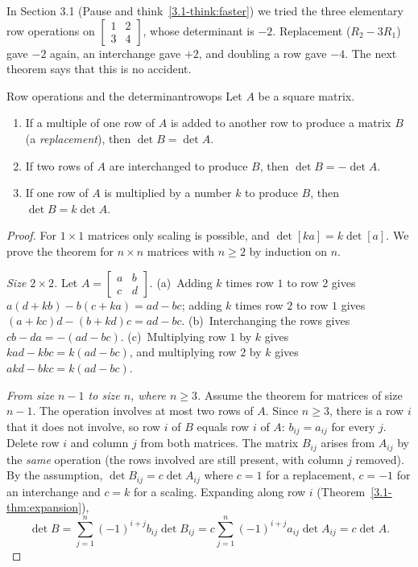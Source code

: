 \documentclass[11pt]{article}
\begin{document}
In Section 3.1 (Pause and think~\ref{3.1-think:faster}) we tried the three elementary row operations on $\begin{bmatrix}1&2\\3&4\end{bmatrix}$, whose determinant is $-2$. Replacement ($R_2-3R_1$) gave $-2$ again, an interchange gave $+2$, and doubling a row gave $-4$. The next theorem says that this is no accident.

\begin{thm}{Row operations and the determinant}{rowops}
Let $A$ be a square matrix.
\begin{enumerate}
  \item[(a)] If a multiple of one row of $A$ is added to another row to produce a matrix $B$ (a \emph{replacement}), then $\det B=\det A$.
  \item[(b)] If two rows of $A$ are interchanged to produce $B$, then $\det B=-\det A$.
  \item[(c)] If one row of $A$ is multiplied by a number $k$ to produce $B$, then $\det B=k\det A$.
\end{enumerate}
\end{thm}

\begin{proof}
For $1\times1$ matrices only scaling is possible, and $\det[ka]=k\det[a]$. We prove the theorem for $n\times n$ matrices with $n\geq2$ by induction on $n$.

\emph{Size $2\times2$.} Let $A=\begin{bmatrix}a&b\\c&d\end{bmatrix}$. (a)~Adding $k$ times row $1$ to row $2$ gives $a(d+kb)-b(c+ka)=ad-bc$; adding $k$ times row $2$ to row $1$ gives $(a+kc)d-(b+kd)c=ad-bc$. (b)~Interchanging the rows gives $cb-da=-(ad-bc)$. (c)~Multiplying row $1$ by $k$ gives $kad-kbc=k(ad-bc)$, and multiplying row $2$ by $k$ gives $akd-bkc=k(ad-bc)$.

\emph{From size $n-1$ to size $n$, where $n\geq3$.} Assume the theorem for matrices of size $n-1$. The operation involves at most two rows of $A$. Since $n\geq3$, there is a row $i$ that it does not involve, so row $i$ of $B$ equals row $i$ of $A$: $b_{ij}=a_{ij}$ for every $j$. Delete row $i$ and column $j$ from both matrices. The matrix $B_{ij}$ arises from $A_{ij}$ by the \emph{same} operation (the rows involved are still present, with column $j$ removed). By the assumption, $\det B_{ij}=c\det A_{ij}$ where $c=1$ for a replacement, $c=-1$ for an interchange and $c=k$ for a scaling. Expanding along row $i$ (Theorem~\ref{3.1-thm:expansion}),
\[
\det B=\sum_{j=1}^{n}(-1)^{i+j}b_{ij}\det B_{ij}=c\sum_{j=1}^{n}(-1)^{i+j}a_{ij}\det A_{ij}=c\det A.
\]
\end{proof}
\end{document}
